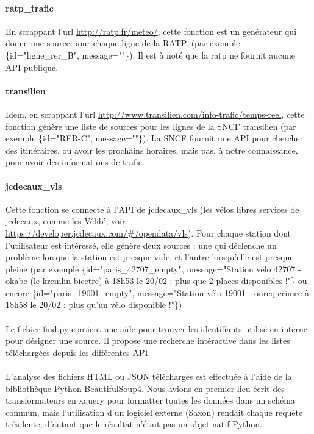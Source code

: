 \documentclass[a4paper, 12pt]{article}
\begin{document}
\paragraph{ratp\_trafic} En scrappant l'url \url{http://ratp.fr/meteo/}, cette
fonction est un générateur qui donne une source pour chaque ligne de la RATP.
(par exemple \{id="ligne\_rer\_B", message=""\}). %
Il est à noté que la ratp ne fournit aucune API publique.

\paragraph{transilien} Idem, en scrappant l'url \url{http://www.transilien.com/info-trafic/temps-reel},
cette fonction génère une liste de sources pour les lignes de la SNCF transilien
(par exemple \{id="RER-C", message=""\}). %
La SNCF fournit une API pour chercher des itinéraires, ou avoir les prochains
horaires, mais pas, à notre connaissance, pour avoir des informations de trafic.

\paragraph{jcdecaux\_vls} Cette fonction se connecte à l'API de jcdecaux\_vls
(les vélos libres services de jcdecaux, comme les Vélib', voir
\url{https://developer.jcdecaux.com/#/opendata/vls}).
Pour chaque station dont l'utilisateur est intéressé, elle génère deux sources :
une qui déclenche un problème lorsque la station est presque vide, et l'autre
lorsqu'elle est presque pleine (par exemple \{id="paris\_42707\_empty",
message="Station vélo 42707 - okabe (le kremlin-bicetre) à 18h53 le 20/02 : plus
que 2 places disponibles !"\} ou encore \{id="paris\_19001\_empty", message="Station
vélo 19001 - ourcq crimee à 18h58 le 20/02 : plus qu'un vélo disponible !"\})

\paragraph{} Le fichier find.py contient une aide pour trouver les identifiants
utilisé en interne pour désigner une source.
Il propose une recherche intéractive dans les listes téléchargées depuis les
différentes API.

\paragraph{} L'analyse des fichiers HTML ou JSON téléchargés est effectuée à
l'aide de la bibliothèque Python
\href{http://www.crummy.com/software/BeautifulSoup/bs4/doc/}{BeautifulSoup4}.
Nous avions en premier lieu écrit des transformateurs en xquery pour formatter
toutes les données dans un schéma commun, mais l'utilisation d'un logiciel
externe (Saxon) rendait chaque requête très lente, d'autant que le résultat
n'était pas un objet natif Python.
\end{document}
